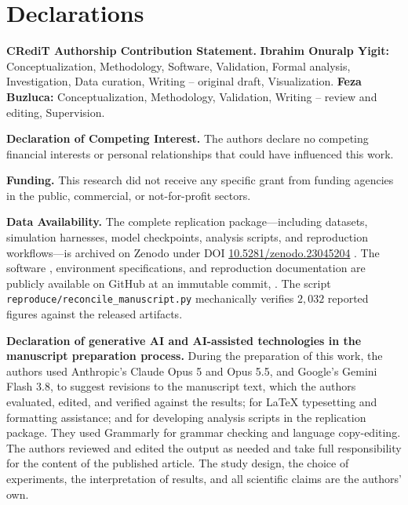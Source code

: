 {\small
\section*{Declarations}

\noindent\textbf{CRediT Authorship Contribution Statement.} \textbf{Ibrahim Onuralp Yigit:} Conceptualization, Methodology, Software, Validation, Formal analysis, Investigation, Data curation, Writing -- original draft, Visualization. \textbf{Feza Buzluca:} Conceptualization, Methodology, Validation, Writing -- review and editing, Supervision.

\noindent\textbf{Declaration of Competing Interest.} The authors declare no competing financial interests or personal relationships that could have influenced this work.

\noindent\textbf{Funding.} This research did not receive any specific grant from funding agencies in the public, commercial, or not-for-profit sectors.

\noindent\textbf{Data Availability.} The complete replication package---including datasets, simulation harnesses, model checkpoints, analysis scripts, and reproduction workflows---is archived on Zenodo under DOI \href{https://doi.org/10.5281/zenodo.23045204}{10.5281/zenodo.23045204} \cite{sag-replication-package}. The software \cite{sag-software}, environment specifications, and reproduction documentation are publicly available on GitHub at an immutable commit, \sagexperiments. The script \texttt{reproduce/reconcile\_manuscript.py} mechanically verifies $2{,}032$ reported figures against the released artifacts.

\noindent\textbf{Declaration of generative AI and AI-assisted technologies in the manuscript preparation process.} During the preparation of this work, the authors used Anthropic's Claude Opus 5 and Opus 5.5, and Google's Gemini Flash 3.8, to suggest revisions to the manuscript text, which the authors evaluated, edited, and verified against the results; for LaTeX typesetting and formatting assistance; and for developing analysis scripts in the replication package. They used Grammarly for grammar checking and language copy-editing. The authors reviewed and edited the output as needed and take full responsibility for the content of the published article. The study design, the choice of experiments, the interpretation of results, and all scientific claims are the authors' own.

}
